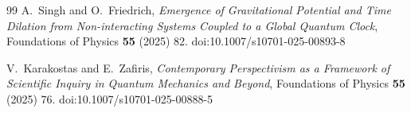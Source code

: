 \documentclass[11pt,a4paper]{article}
\theoremstyle{thmstyleone}
\theoremstyle{thmstyletwo}
\theoremstyle{thmstylethree}
\begin{document}
\begin{thebibliography}{99}
        A.~Singh and O.~Friedrich,
        \textit{Emergence of Gravitational Potential and Time Dilation from Non-interacting Systems Coupled to a Global Quantum Clock},
        Foundations of Physics \textbf{55} (2025) 82.
        doi:10.1007/s10701-025-00893-8

        V.~Karakostas and E.~Zafiris,
        \textit{Contemporary Perspectivism as a Framework of Scientific Inquiry in Quantum Mechanics and Beyond},
        Foundations of Physics \textbf{55} (2025) 76.
        doi:10.1007/s10701-025-00888-5

    \end{thebibliography}
\end{document}
